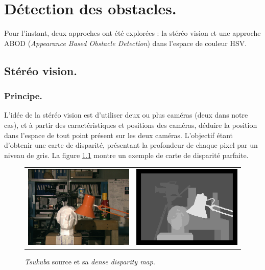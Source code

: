 \chapter{Détection des obstacles.}
Pour l'instant, deux approches ont été explorées : la stéréo vision et une approche ABOD (\emph{Appearance Based Obstacle Detection}) dans l'espace de couleur HSV.

\section{Stéréo vision.}
\subsection{Principe.} L'idée de la stéréo vision est d'utiliser deux ou plus caméras (deux dans notre cas), et à partir des caractéristiques et positions des caméras, déduire la position dans l'espace de tout point présent sur les deux caméras. L'objectif étant d'obtenir une carte de disparité, présentant la profondeur de chaque pixel par un niveau de gris. La figure \ref{disparity} montre un exemple de carte de disparité parfaite.

\begin{figure}
    \begin{center}
        \begin{tabular}{cc}
            \includegraphics[width=0.4\linewidth]{rcs/tsukuba.png} & \includegraphics[width=0.4\linewidth]{rcs/tsukuba_disp.png} \\
        \end{tabular}
    \end{center}
    \caption{\emph{Tsukuba} source et sa \emph{dense disparity map}.}
    \label{disparity}
\end{figure}

